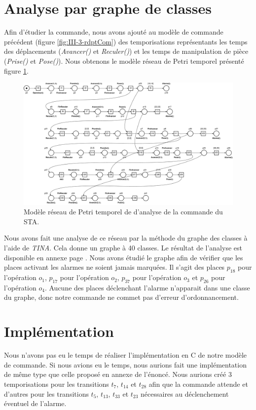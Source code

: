\section{Analyse par graphe de classes}
Afin d'étudier la commande, nous avons ajouté au modèle de commande précédent (figure \ref{fig:III-3-rdptCom}) des temporisations représentants les temps des déplacements (\emph{Avancer()} et \emph{Reculer()}) et les temps de manipulation de pièce (\emph{Prise()} et \emph{Pose()}). Nous obtenons le modèle réseau de Petri temporel présenté figure \ref{fig:III-3-rdptAnalyse}.
\begin{figure}[!ht]
\centering
\includegraphics[width=\textwidth]{./III/images/reseau_Commande--III-3.pdf}
\caption{\label{fig:III-3-rdptAnalyse}Modèle réseau de Petri temporel de d'analyse de la commande du STA.}
\end{figure}

Nous avons fait une analyse de ce réseau par la méthode du graphe des classes à l'aide de \emph{TINA}. Cela donne un graphe à 40 classes. Le résultat de l'analyse est disponible en annexe page \pageref{Annex:III}. Nous avons étudié le graphe afin de vérifier que les places activant les alarmes ne soient jamais marquées. Il s'agit des places $p_{18}$ pour l'opération $o_1$, $p_{17}$ pour l'opération $o_2$, $p_{37}$ pour l'opération $o_3$ et $p_{26}$ pour l'opération $o_4$. Aucune des places déclenchant l'alarme n'apparait dans une classe du graphe, donc notre commande ne commet pas d'erreur d'ordonnancement.


\newpage
\section{Implémentation}
Nous n'avons pas eu le temps de réaliser l'implémentation en C de notre modèle de commande. 
Si nous avions eu le temps, nous aurions fait une implémentation de même type que celle proposé en annexe de l'énoncé. Nous aurions créé 3 temporisations pour les transitions $t_7$, $t_{14}$ et $t_{28}$ afin que la commande attende et d'autres pour les transitions $t_{5}$, $t_{13}$, $t_{33}$ et $t_{23}$ nécessaires au déclenchement éventuel de l'alarme.